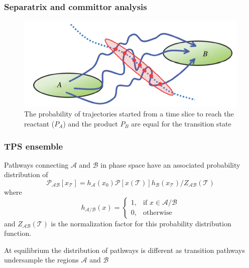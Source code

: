 \documentclass{beamer}
\begin{document}
\begin{frame}
\frametitle{Separatrix and committor analysis}
\begin{figure}
\centering 
\includegraphics[scale=0.4]{figures/separatrix-full.png}
\caption{The probability of trajectories started from a time slice to reach the reactant ($P_A$) and the product $P_B$
are equal for the transition state}
\end{figure}
\end{frame}
\begin{frame}
\frametitle{TPS ensemble}
Pathways connecting $\mathcal{A}$ and $\mathcal{B}$ in phase space have an associated probability distribution of
\begin{equation}
\mathcal{P}_{\mathcal{AB}}[x_{\mathcal{T}}] = h_{\mathcal{A}}(x_0)\mathcal{P}[x(\mathcal{T})]
h_{\mathcal{B}}(x_{\mathcal{T}})/Z_{\mathcal{AB}}(\mathcal{T})\label{eqn:tpsensem}\nonumber 
\end{equation}
where 
\[
    h_{\mathcal{A}/\mathcal{B}}(x)= 
\begin{cases}
    1, & \text{if } x\in \mathcal{A}/\mathcal{B}\\
    0,              & \text{otherwise}
\end{cases}
\]
and $Z_{\mathcal{AB}}(\mathcal{T})$ is the normalization factor for this 
probability distribution function.
\begin{block}{}
At equilibrium the distribution of pathways is different as transition pathways undersample the 
regions $\mathcal{A}$ and $\mathcal{B}$
\end{block}
\end{frame}
%
\end{document}
